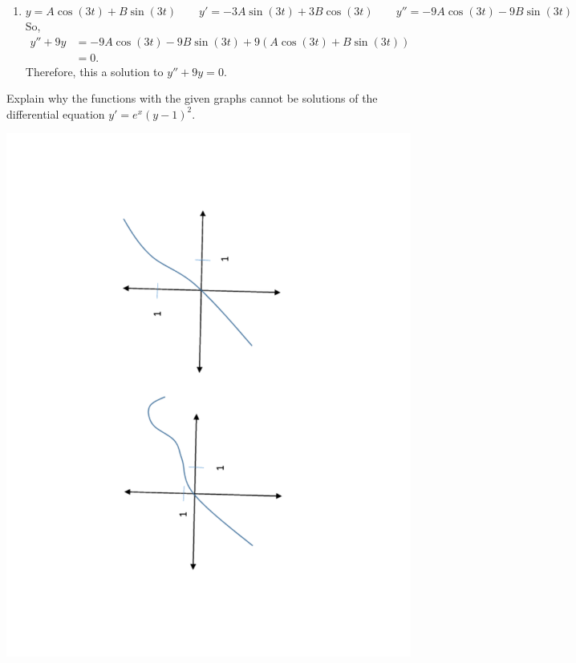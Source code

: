 \documentclass[noinstructornotes]{ximera}
\begin{document}
\begin{problem}
\begin{freeResponse}
\begin{enumerate}
	
	
	\item  \[ y = A\cos(3t)+B\sin(3t) 	\qquad	y'=-3A\sin(3t)+3B\cos(3t) 	\qquad	y''=-9A\cos(3t)-9B\sin(3t) \]  
	So,
		\begin{align*}
		y''+9y 
		&= -9A\cos(3t)-9B\sin(3t) +9(A\cos(3t)+B\sin(3t))  \\
		&= 0.
		\end{align*}
	Therefore, this  a solution to $y''+9y=0$.
	
	\end{enumerate}
	\end{freeResponse}
	
\begin{problem}
Explain why the functions with the given graphs cannot be solutions of the differential equation $y' = e^x (y-1)^2$.
	\begin{image}
	\includegraphics[trim= 170 200 190 180, scale=0.8, angle=-88.69]{Figure8-1-1.pdf}	
	\end{image}


\end{problem}
\end{problem}
\end{document}
